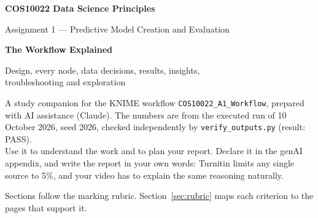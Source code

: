 \documentclass[11pt,a4paper]{article}
\newcommand{\cd}[1]{\texttt{#1}}                     %
\begin{document}
\begin{titlepage}
\centering
\vspace*{3cm}
{\LARGE\bfseries COS10022 Data Science Principles\par}
\vspace{4mm}
{\Large Assignment 1 --- Predictive Model Creation and Evaluation\par}
\vspace{1.2cm}
{\huge\bfseries The Workflow Explained\par}
\vspace{4mm}
{\large Design, every node, data decisions, results, insights,\\ troubleshooting and exploration\par}
\vspace{2cm}
\begin{minipage}{0.82\linewidth}
\begin{keypoint}
A study companion for the KNIME workflow \cd{COS10022\_A1\_Workflow}, prepared with AI assistance
(Claude). The numbers are from the executed run of 10 October 2026, seed 2026, checked
independently by \cd{verify\_outputs.py} (result: PASS).\\[3pt]
Use it to understand the work and to plan your report. Declare it in the genAI appendix, and write
the report in your own words: Turnitin limits any single source to 5\%, and your video has to
explain the same reasoning naturally.
\end{keypoint}
\end{minipage}
\vfill
{\small Sections follow the marking rubric. Section~\ref{sec:rubric} maps each criterion to the pages that support it.}
\end{titlepage}

\tableofcontents
\newpage

\end{document}
